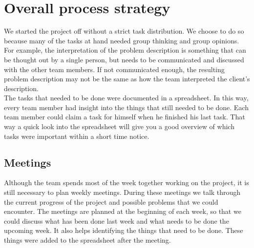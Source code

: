 \section{Overall process strategy}
We started the project off without a strict task distribution.
We choose to do so because many of the tasks at hand needed group thinking and group opinions.
For example, the interpretation of the problem description is something that can be thought out by a single person, but needs to be communicated and discussed with the other team members.
If not communicated enough, the resulting problem description may not be the same as how the team interpreted the client's description.\\
The tasks that needed to be done were documented in a spreadsheet.
In this way, every team member had insight into the things that still needed to be done.
Each team member could claim a task for himself when he finished his last task.
That way a quick look into the spreadsheet will give you a good overview of which tasks were important within a short time notice.

\subsection{Meetings}
Although the team spends most of the week together working on the project, it is still necessary to plan weekly meetings.
During these meetings we talk through the current progress of the project and possible problems that we could encounter.
The meetings are planned at the beginning of each week, so that we could discuss what has been done last week and what needs to be done the upcoming week.
It also helps identifying the things that need to be done. These things were added to the spreadsheet after the meeting.

